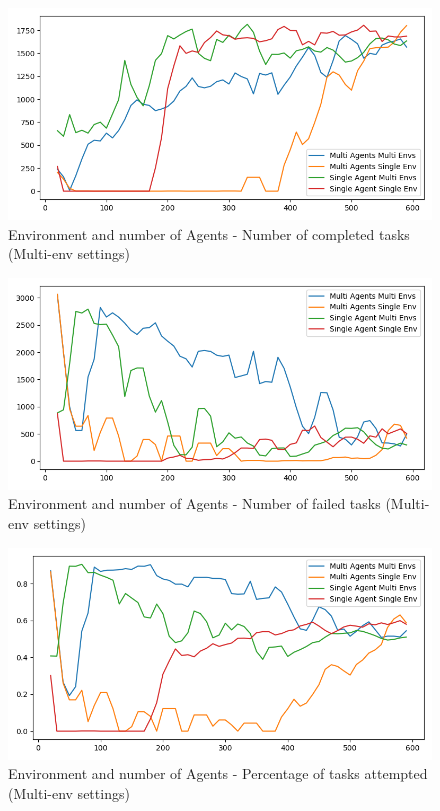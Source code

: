 \begin{figure}[H]
    \centering
    \includegraphics[width=\linewidth]{figures/5_evaluation_figs/env_agent_num_training_fig/num_completed_tasks.png}
    \caption{Environment and number of Agents - Number of completed tasks (Multi-env settings)}
    \label{fig:multi-env-num-completed-tasks}
\end{figure}

\begin{figure}[H]
    \centering
    \includegraphics[width=\linewidth]{figures/5_evaluation_figs/env_agent_num_training_fig/num_failed_tasks.png}
    \caption{Environment and number of Agents - Number of failed tasks (Multi-env settings)}
    \label{fig:multi-env-num-failed-tasks}
\end{figure}

\begin{figure}[H]
    \centering
    \includegraphics[width=\linewidth]{figures/5_evaluation_figs/env_agent_num_training_fig/percent_tasks.png}
    \caption{Environment and number of Agents - Percentage of tasks attempted (Multi-env settings)}
    \label{fig:multi-env-percent-tasks}
\end{figure}

